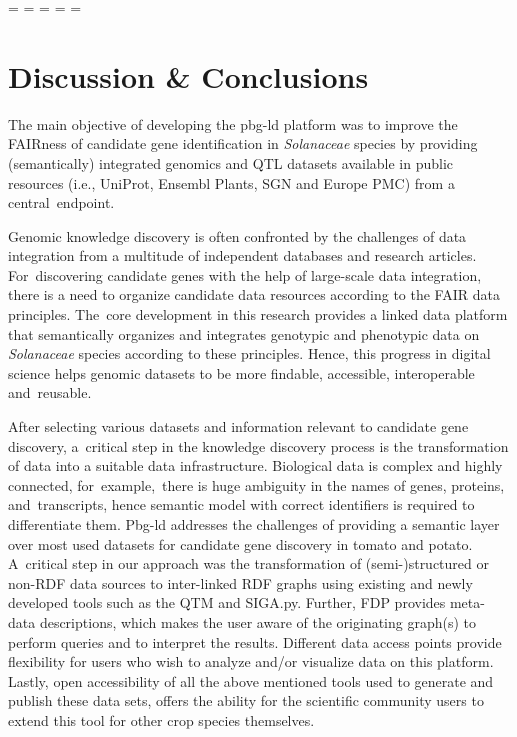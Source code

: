 \documentclass[applsci,article,accept,moreauthors,pdftex]{Definitions/mdpi}
\begin{document}
{%


\newpage
\restoregeometry
\paperwidth=\pdfpageheight
\paperheight=\pdfpagewidth
\pdfpageheight=\paperheight
\pdfpagewidth=\paperwidth
\headwidth=\textwidth



\section{Discussion \& Conclusions}
The main objective of developing the pbg-ld platform was to improve the FAIRness of candidate gene identification in \textit{Solanaceae} %
species by providing (semantically) integrated genomics and QTL datasets available in public resources (i.e., UniProt, Ensembl Plants, SGN and Europe PMC) from a central~endpoint. 

Genomic knowledge discovery is often confronted by the challenges of data integration from a multitude of independent databases and research articles. For~discovering candidate genes with the help of large-scale data integration, there is a need to organize candidate data resources according to the FAIR data principles. The~core development in this research provides a linked data platform that semantically organizes and integrates genotypic and phenotypic data on \textit{Solanaceae} %
species according to these principles. Hence, this progress in digital science helps genomic datasets to be more findable, accessible, interoperable and~reusable.

After selecting various datasets and information relevant to candidate gene discovery, a~critical step in the knowledge discovery process is the transformation of data into a suitable data infrastructure. Biological data is complex and highly connected, for~example,~there is huge ambiguity in the names of genes, proteins, and~transcripts, hence semantic model with correct identifiers is required to differentiate them. Pbg-ld addresses the challenges of providing a semantic layer over most used datasets for candidate gene discovery in tomato and potato. A~critical step in our approach was the transformation of (semi-)structured or non-RDF data sources to inter-linked RDF graphs using existing and newly developed tools such as the QTM and SIGA.py. Further, FDP provides meta-data descriptions, which makes the user aware of the originating graph(s) to perform queries and to interpret the results. Different data access points provide flexibility for users who wish to analyze and/or visualize data on this platform. {Lastly, open accessibility of all the above mentioned tools used to generate and publish these data sets, offers the ability for the scientific community users to extend this tool for other crop species themselves.} 

}
\end{document}
